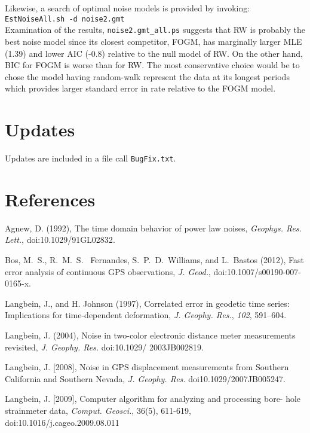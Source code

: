 \documentclass[12pt]{amsart}
\begin{document}
Likewise, a search of optimal noise models is provided by invoking:
\\
\texttt{EstNoiseAll.sh  -d noise2.gmt}
\\
Examination of the results, \texttt{noise2.gmt\_all.ps} suggests that RW is probably the best noise model since
its closest competitor, FOGM, has marginally larger MLE (1.39) and lower AIC (-0.8) relative to the null model of RW.
On the other hand, BIC for FOGM is worse than for RW.  The most conservative choice would be to chose the model
having random-walk represent the data at its longest periods which provides larger standard error in rate relative to
the FOGM model.

\section{Updates}

Updates are included in a file call \texttt{BugFix.txt}.

\section{References}

Agnew, D. (1992), The time domain behavior of power law noises, \textit{Geophys. Res. Lett.},  doi:{10.1029/91GL02832}.

Bos, M.~S., R.~M.~S.~ Fernandes, S.~P.~D.~Williams, and L.~Bastos (2012), Fast error analysis of
continuous GPS observations,
\textit{J. Geod.},  doi:{10.1007/s00190-007-0165-x}.

 
Langbein, J., and H. Johnson (1997), Correlated error in geodetic time series: Implications for
time-dependent deformation, \textit{J.  Geophy. Res.},  \textit{102}, 591--604.

Langbein, J. (2004), Noise in two-color electronic distance meter measurements revisited, 
 \textit{J.  Geophy. Res.}  doi:{10.1029/ 2003JB002819}.
 
Langbein, J. [2008], Noise in GPS displacement measurements from Southern California and Southern Nevada, 
 \textit{J.  Geophy. Res.}  doi{10.1029/2007JB005247}.

Langbein, J. [2009], Computer algorithm for analyzing and processing bore- hole strainmeter data, \textit{Comput. Geosci.}, 36(5), 611-619, doi:{10.1016/j.cageo.2009.08.011}
\end{document}
